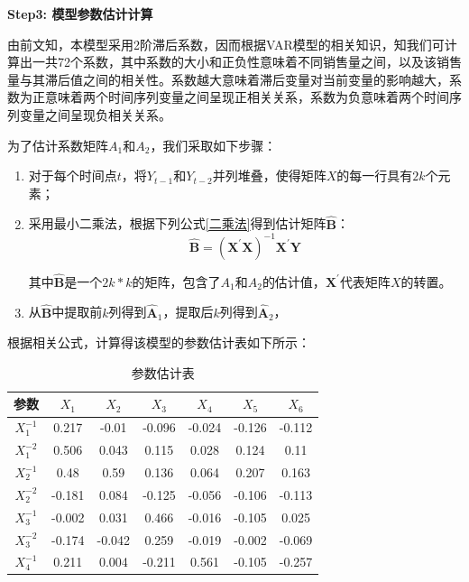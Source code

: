 \documentclass{my_paper}
\begin{document}
\begin{itemize}
\vspace{0.5cm}
\textbf{Step3: 模型参数估计计算}\par
由前文知，本模型采用2阶滞后系数，因而根据VAR模型的相关知识，知我们可计算出一共72个系数，其中系数的大小和正负性意味着不同销售量之间，以及该销售量与其滞后值之间的相关性。系数越大意味着滞后变量对当前变量的影响越大，系数为正意味着两个时间序列变量之间呈现正相关关系，系数为负意味着两个时间序列变量之间呈现负相关关系。\par
为了估计系数矩阵$A_1$和$A_2$，我们采取如下步骤：
\begin{enumerate}
    \item 对于每个时间点$t$，将$Y_{t-1}$和$Y_{t-2}$并列堆叠，使得矩阵$X$的每一行具有$2k$个元素；
    \item 采用最小二乘法，根据下列公式\ref{二乘法}得到估计矩阵$\hat{\mathbf{B}}$：
        \begin{equation}
            \label{二乘法}
            \hat{\mathbf{B}}=\left(\mathbf{X}^{\prime} \mathbf{X}\right)^{-1} \mathbf{X}^{\prime} \mathbf{Y}
        \end{equation}\par
    其中$\hat{\mathbf{B}}$是一个$2k*k$的矩阵，包含了$A_1$和$A_2$的估计值，$\mathbf{X}^{\prime}$代表矩阵$X$的转置。
    \item 从$\hat{\mathbf{B}}$中提取前$k$列得到$\hat{\mathbf{A}}_1$，提取后$k$列得到$\hat{\mathbf{A}}_2$，
\end{enumerate}\par
根据相关公式，计算得该模型的参数估计表如下所示：\par
\begin{table}[H]
    \centering
    \caption{参数估计表}
    \begin{tabular}{ccccccc} 
    \toprule
        参数  & $X_1$& $X_2$ & $X_3$ & $X_4$ & $X_5$ & $X_6$\\ 
        \midrule
        $X_1^{-1}$ & 0.217 & -0.01 & -0.096 & -0.024 & -0.126 & -0.112 \\
        $X_1^{-2}$ & 0.506 & 0.043 & 0.115 & 0.028 & 0.124 & 0.11 \\
        $X_2^{-1}$ & 0.48 & 0.59 & 0.136 & 0.064 & 0.207 & 0.163 \\ 
        $X_2^{-2}$ & -0.181 & 0.084 & -0.125 & -0.056 & -0.106 & -0.113 \\ 
        $X_3^{-1}$ & -0.002 & 0.031 & 0.466 & -0.016 & -0.105 & 0.025 \\ 
        $X_3^{-2}$ & -0.174 & -0.042 & 0.259 & -0.019 & -0.002 & -0.069 \\ 
        $X_4^{-1}$ & 0.211 & 0.004 & -0.211 & 0.561 & -0.105 & -0.257 \\ 

\end{tabular}
\end{table}
\end{itemize}
\end{document}
